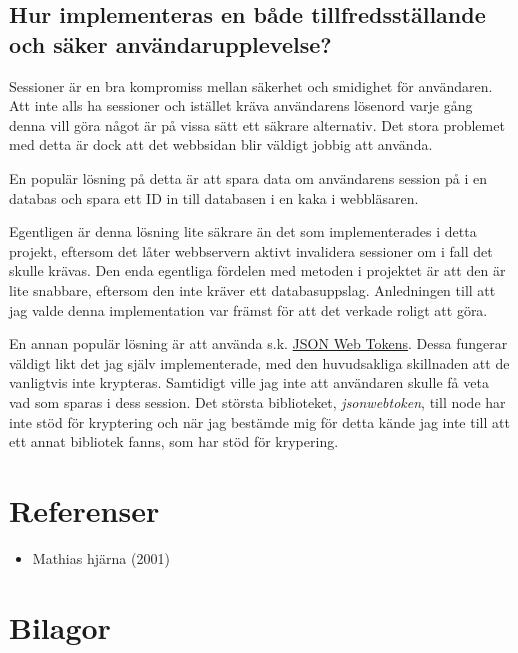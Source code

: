 \documentclass{article}
\begin{document}
\subsection{
	Hur implementeras en både tillfredsställande och säker användarupplevelse?
}

Sessioner är en bra kompromiss mellan säkerhet och smidighet för användaren. Att
inte alls ha sessioner och istället kräva användarens lösenord varje gång denna
vill göra något är på vissa sätt ett säkrare alternativ. Det stora problemet med
detta är dock att det webbsidan blir väldigt jobbig att använda.

En populär lösning på detta är att spara data om användarens session på i en
databas och spara ett ID in till databasen i en kaka i webbläsaren.

Egentligen är denna lösning lite säkrare än det som implementerades i detta
projekt, eftersom det låter webbservern aktivt invalidera sessioner om i fall
det skulle krävas. Den enda egentliga fördelen med metoden i projektet är att
den är lite snabbare, eftersom den inte kräver ett databasuppslag. Anledningen
till att jag valde denna implementation var främst för att det verkade roligt
att göra.

En annan populär lösning är att använda s.k. \href{https://jwt.io}{JSON Web
Tokens}. Dessa fungerar väldigt likt det jag själv implementerade, med den
huvudsakliga skillnaden att de vanligtvis inte krypteras. Samtidigt ville jag
inte att användaren skulle få veta vad som sparas i dess session. Det största
biblioteket, \textit{jsonwebtoken}, till node har inte stöd för kryptering och
när jag bestämde mig för detta kände jag inte till att ett annat bibliotek
fanns, som har stöd för krypering.

\section{Referenser}

\begin{itemize}
	\item Mathias hjärna (2001)
\end{itemize}

\section{Bilagor}

\listoffigures{}

\listoflistings{}
\end{document}
